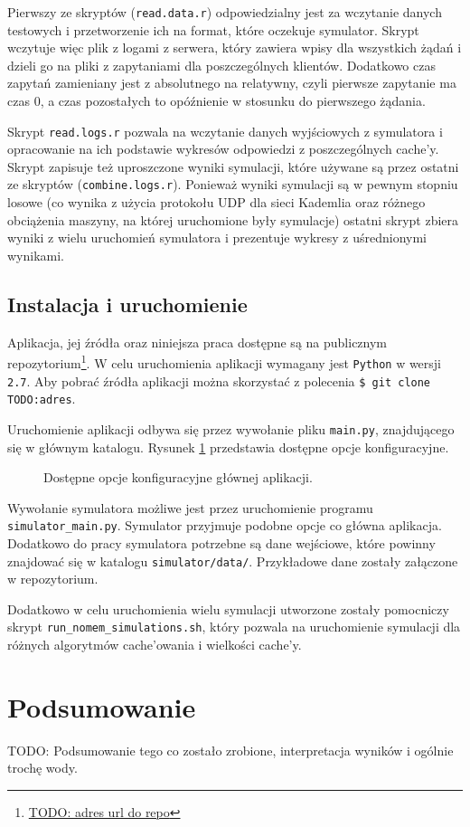 \documentclass[a4paper,11pt]{scrartcl}
\newcommand{\f}{\texttt}
\newcommand{\s}{ }
\newcommand{\keszy}{cache'y}
\newcommand{\keszowania}{cache'owania}
\begin{document}
Pierwszy ze skryptów (\f{read.data.r}) odpowiedzialny jest za wczytanie danych testowych i przetworzenie ich na format, które oczekuje symulator. Skrypt wczytuje więc plik z logami z serwera, który zawiera wpisy dla wszystkich żądań i dzieli go na pliki z zapytaniami dla poszczególnych klientów. Dodatkowo czas zapytań zamieniany jest z absolutnego na relatywny, czyli pierwsze zapytanie ma czas $0$, a czas pozostałych to opóźnienie w stosunku do pierwszego żądania.

Skrypt \f{read.logs.r} pozwala na wczytanie danych wyjściowych z symulatora i opracowanie na ich podstawie wykresów odpowiedzi z poszczególnych \keszy. Skrypt zapisuje też uproszczone wyniki symulacji, które używane są przez ostatni ze skryptów (\f{combine.logs.r}). Ponieważ wyniki symulacji są w pewnym stopniu losowe (co wynika z użycia protokołu UDP dla sieci Kademlia oraz różnego obciążenia maszyny, na której uruchomione były symulacje) ostatni skrypt zbiera wyniki z wielu uruchomień symulatora i prezentuje wykresy z uśrednionymi wynikami.

\subsection{Instalacja i uruchomienie}
\label{sect_impl_install}
Aplikacja, jej źródła oraz niniejsza praca dostępne są na publicznym repozytorium\footnote{\url{TODO: adres url do repo}}. W celu uruchomienia aplikacji wymagany jest \f{Python} w wersji \f{2.7}. Aby pobrać źródła aplikacji można skorzystać z polecenia \f{\$ git clone TODO:adres}.

Uruchomienie aplikacji odbywa się przez wywołanie pliku \f{main.py}, znajdującego się w głównym katalogu. Rysunek \ref{fig_main_help} przedstawia dostępne opcje konfiguracyjne.

\begin{figure}[h]
\caption{Dostępne opcje konfiguracyjne głównej aplikacji.}
\label{fig_main_help}
\end{figure}

Wywołanie symulatora możliwe jest przez uruchomienie programu \f{simulator\_main.py}. Symulator przyjmuje podobne opcje co główna aplikacja. Dodatkowo do pracy symulatora potrzebne są dane wejściowe, które powinny znajdować się w katalogu \f{simulator/data/}. Przykładowe dane zostały załączone w repozytorium.

Dodatkowo w celu uruchomienia wielu symulacji utworzone zostały pomocniczy skrypt \f{run\_nomem\_simulations.sh}, który pozwala na uruchomienie symulacji dla różnych algorytmów \keszowania\s i wielkości \keszy.


\section{Podsumowanie}

TODO: Podsumowanie tego co zostało zrobione, interpretacja wyników i ogólnie trochę wody.




\end{document}
